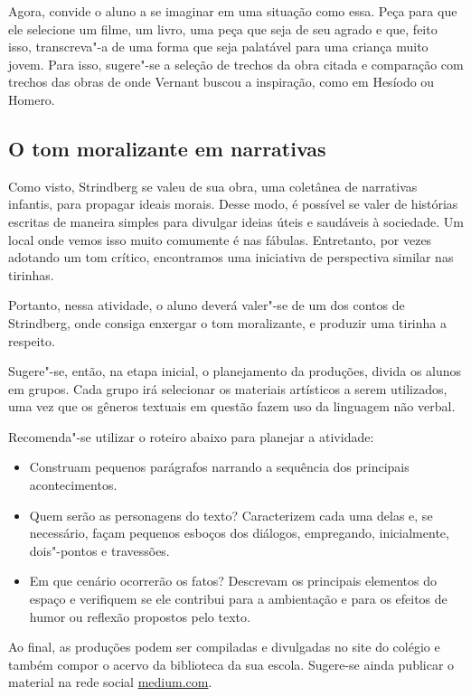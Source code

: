 \documentclass[12pt]{extarticle}
\begin{document}
Agora, convide o aluno a se imaginar em uma situação como essa. Peça
para que ele selecione um filme, um livro, uma peça que seja de seu
agrado e que, feito isso, transcreva"-a de uma forma que seja palatável
para uma criança muito jovem. Para isso, sugere"-se a seleção de trechos
da obra citada e comparação com trechos das obras de onde Vernant buscou
a inspiração, como em Hesíodo ou Homero.
    
\subsection{O tom moralizante em narrativas}

Como visto, Strindberg se valeu de sua obra, uma coletânea de
narrativas infantis, para propagar ideais morais. Desse modo, é
possível se valer de histórias escritas de maneira simples para
divulgar ideias úteis e saudáveis à sociedade. Um local onde vemos
isso muito comumente é nas fábulas. Entretanto, por vezes adotando um
tom crítico, encontramos uma iniciativa de perspectiva similar nas
tirinhas.

Portanto, nessa atividade, o aluno deverá valer"-se de um dos contos de
Strindberg, onde consiga enxergar o tom moralizante, e produzir uma
tirinha a respeito.

Sugere"-se, então, na etapa inicial, o planejamento da produções, divida
os alunos em grupos. Cada grupo irá selecionar os materiais artísticos a
serem utilizados, uma vez que os gêneros textuais em questão fazem uso
da linguagem não verbal.

Recomenda"-se utilizar o roteiro abaixo para planejar a atividade:

\begin{itemize}
\item
Construam pequenos parágrafos narrando a sequência dos principais
acontecimentos.
\item
Quem serão as personagens do texto? Caracterizem cada uma delas e, se
necessário, façam pequenos esboços dos diálogos, empregando,
inicialmente, dois"-pontos e travessões.
\item
Em que cenário ocorrerão os fatos? Descrevam os principais elementos
do espaço e verifiquem se ele contribui para a ambientação e para os
efeitos de humor ou reflexão propostos pelo texto.
\end{itemize}

Ao final, as produções podem ser compiladas e divulgadas no site do
colégio e também compor o acervo da biblioteca da sua escola.
Sugere-se ainda publicar o material na rede social \url{medium.com}.
\end{document}

